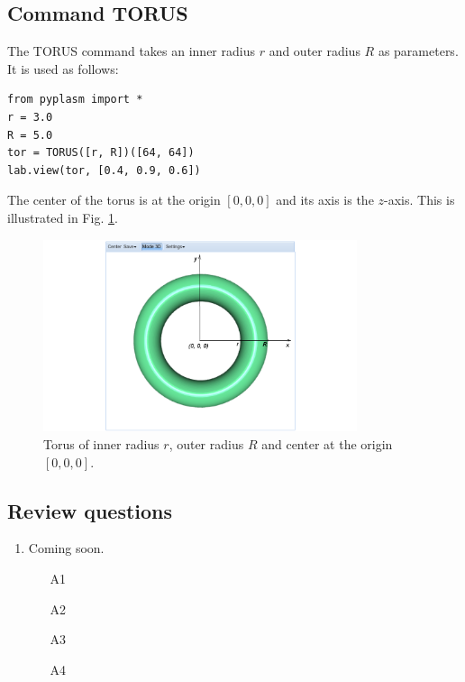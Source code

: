 \documentclass{article}
\begin{document}
\subsection{Command TORUS}

The TORUS command takes an inner radius $r$ and outer radius 
$R$ as parameters. It is used as follows:
\begin{verbatim}
from pyplasm import *
r = 3.0
R = 5.0
tor = TORUS([r, R])([64, 64])
lab.view(tor, [0.4, 0.9, 0.6])
\end{verbatim}
The center of the torus is at the origin $[0, 0, 0]$ and its axis
is the $z$-axis. This is illustrated in Fig. \ref{fig:torus-1}.

\newpage

\begin{figure}[!ht]
\begin{center}
\includegraphics[width=0.82\textwidth]{img/torus-1.png}
\end{center}
\vspace{-2mm}
\caption{Torus of inner radius $r$, outer radius $R$ and center at the origin $[0, 0, 0]$.}
\label{fig:torus-1}
\end{figure}

\subsection{Review questions}

\begin{enumerate}
\item Coming soon.
\begin{itemize}
\item[A1]
\item[A2]
\item[A3]
\item[A4]
\end{itemize}
\end{enumerate}
\end{document}
